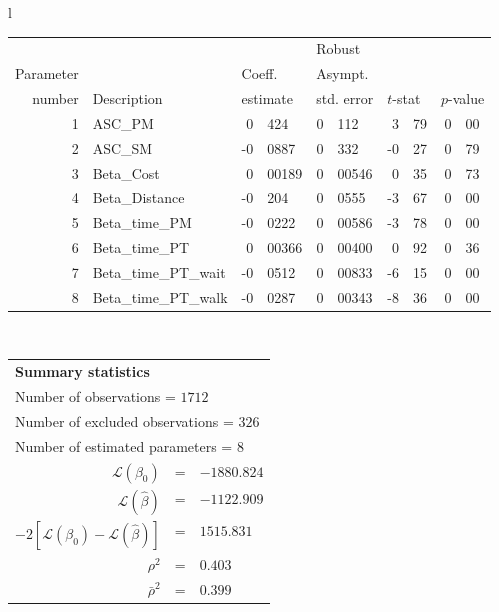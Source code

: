   \begin{tabular}{l}
\begin{tabular}{rlr@{.}lr@{.}lr@{.}lr@{.}l}
         &                       &   \multicolumn{2}{l}{}    & \multicolumn{2}{l}{Robust}  &     \multicolumn{4}{l}{}   \\
Parameter &                       &   \multicolumn{2}{l}{Coeff.}      & \multicolumn{2}{l}{Asympt.}  &     \multicolumn{4}{l}{}   \\
number &  Description                     &   \multicolumn{2}{l}{estimate}      & \multicolumn{2}{l}{std. error}  &   \multicolumn{2}{l}{$t$-stat}  &   \multicolumn{2}{l}{$p$-value}   \\

\hline

1 & ASC_PM  & 0&424 & 0&112 & 3&79 & 0&00\\
2 & ASC_SM & -0&0887 & 0&332 & -0&27 & 0&79\\
3 & Beta_Cost & 0&00189 & 0&00546 & 0&35 & 0&73\\
4 & Beta_Distance & -0&204 & 0&0555 & -3&67 & 0&00\\
5 & Beta_time_PM & -0&0222 & 0&00586 & -3&78 & 0&00\\
6 & Beta_time_PT & 0&00366 & 0&00400 & 0&92 & 0&36\\
7 & Beta_time_PT_wait & -0&0512 & 0&00833 & -6&15 & 0&00\\
8 & Beta_time_PT_walk & -0&0287 & 0&00343 & -8&36 & 0&00\\
\hline
\end{tabular}
\\
\begin{tabular}{rcl}
\multicolumn{3}{l}{\bf Summary statistics}\\
\multicolumn{3}{l}{ Number of observations = $1712$} \\
\multicolumn{3}{l}{ Number of excluded observations = $326$} \\
\multicolumn{3}{l}{ Number of estimated  parameters = $8$} \\
 $\mathcal{L}(\beta_0)$ &=&  $-1880.824$ \\
 $\mathcal{L}(\hat{\beta})$ &=& $-1122.909 $  \\
 $-2[\mathcal{L}(\beta_0) -\mathcal{L}(\hat{\beta})]$ &=& $1515.831$ \\
    $\rho^2$ &=&   $0.403$ \\
    $\bar{\rho}^2$ &=&    $0.399$ \\
\end{tabular}
  \end{tabular}
